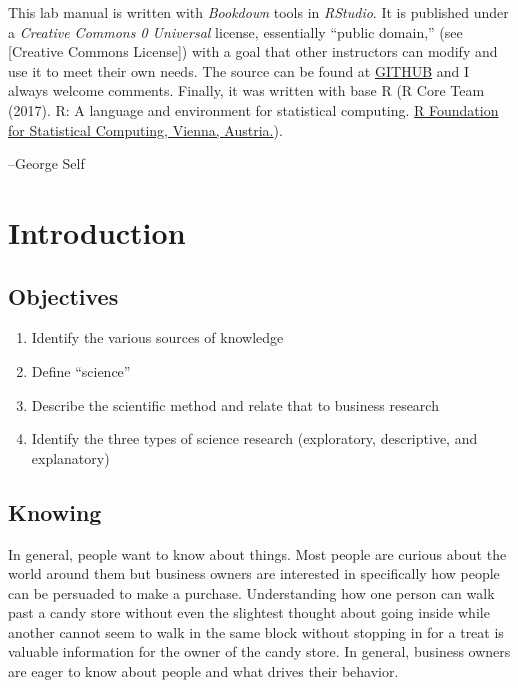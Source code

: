 \documentclass[]{book}
\providecommand{\tightlist}{%
  \setlength{\itemsep}{0pt}\setlength{\parskip}{0pt}}
\theoremstyle{definition}
\theoremstyle{definition}
\theoremstyle{definition}
\theoremstyle{remark}
\begin{document}
This lab manual is written with \emph{Bookdown} tools in \emph{RStudio}.
It is published under a \emph{Creative Commons 0 Universal} license,
essentially ``public domain,'' (see {[}Creative Commons License{]}) with
a goal that other instructors can modify and use it to meet their own
needs. The source can be found at \href{https://goo.gl/6dZqCK}{GITHUB}
and I always welcome comments. Finally, it was written with base R (R
Core Team (2017). R: A language and environment for statistical
computing. \href{https://www.R-project.org/}{R Foundation for
Statistical Computing, Vienna, Austria.}).

--George Self

\hypertarget{introduction}{%
\chapter{Introduction}\label{introduction}}

\hypertarget{objectives}{%
\section{Objectives}\label{objectives}}

\begin{enumerate}
\def\labelenumi{\arabic{enumi}.}
\tightlist
\item
  Identify the various sources of knowledge
\item
  Define ``science''
\item
  Describe the scientific method and relate that to business research
\item
  Identify the three types of science research (exploratory,
  descriptive, and explanatory)
\end{enumerate}

\hypertarget{knowing}{%
\section{Knowing}\label{knowing}}

In general, people want to know about things. Most people are curious
about the world around them but business owners are interested in
specifically how people can be persuaded to make a purchase.
Understanding how one person can walk past a candy store without even
the slightest thought about going inside while another cannot seem to
walk in the same block without stopping in for a treat is valuable
information for the owner of the candy store. In general, business
owners are eager to know about people and what drives their behavior.
\end{document}
